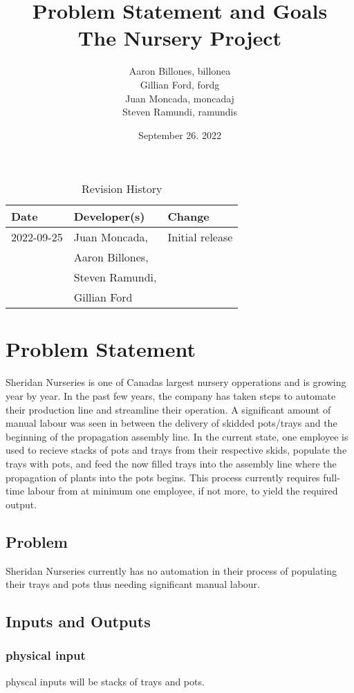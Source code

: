 \documentclass{article}
\title{Problem Statement and Goals\\The Nursery Project}
\author{Aaron Billones, billonea\\Gillian Ford, fordg\\Juan Moncada, moncadaj\\Steven Ramundi, ramundis}
\date{September 26. 2022}
\begin{document}
\maketitle

\begin{table}[hp]
\caption{Revision History} \label{TblRevisionHistory}
\begin{tabularx}{\textwidth}{llX}
\toprule
\textbf{Date} & \textbf{Developer(s)} & \textbf{Change}\\
\midrule
2022-09-25 & Juan Moncada,& Initial release\\&Aaron Billones,\\&Steven Ramundi,\\&Gillian Ford \\
 
\bottomrule
\end{tabularx}
\end{table}

\newpage

\section{Problem Statement}

Sheridan Nurseries is one of Canadas largest nursery opperations and is growing year by year.
In the past few years, the company has taken steps to automate their production line and streamline their operation.
A significant amount of manual labour was seen in between the delivery of skidded pots/trays and the beginning of the propagation 
assembly line. In the current state, one employee is used to recieve stacks of pots and trays from their respective skids,
populate the trays with pots, and feed the now filled trays into the assembly line where the propagation of plants into the pots begins.
This process currently requires full-time labour from at minimum one employee, if not more, to yield the required output.

\subsection{Problem}
Sheridan Nurseries currently has no automation in their process of populating their trays and pots thus needing significant manual labour.

\subsection{Inputs and Outputs}
\subsubsection{physical input}
physcal inputs will be stacks of trays and pots.
\end{document}
